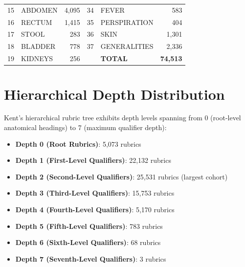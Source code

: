 \begin{sloppypar}
\begin{table}[htp]
\begin{tabular}{|c|l|r||c|l|r|}
15 & ABDOMEN            & 4,095  & 34 & FEVER              & 583    \\
16 & RECTUM             & 1,415  & 35 & PERSPIRATION       & 404    \\
17 & STOOL              & 283    & 36 & SKIN               & 1,301  \\
18 & BLADDER            & 778    & 37 & GENERALITIES       & 2,336  \\
19 & KIDNEYS            & 256    &    & \textbf{TOTAL}     & \textbf{74,513} \\
\hline
\end{tabular}
\end{table}

\section{Hierarchical Depth Distribution}
Kent's hierarchical rubric tree exhibits depth levels spanning from 0 (root-level anatomical headings) to 7 (maximum qualifier depth):
\begin{itemize}
    \item \textbf{Depth 0 (Root Rubrics)}: 5,073 rubrics
    \item \textbf{Depth 1 (First-Level Qualifiers)}: 22,132 rubrics
    \item \textbf{Depth 2 (Second-Level Qualifiers)}: 25,531 rubrics (largest cohort)
    \item \textbf{Depth 3 (Third-Level Qualifiers)}: 15,753 rubrics
    \item \textbf{Depth 4 (Fourth-Level Qualifiers)}: 5,170 rubrics
    \item \textbf{Depth 5 (Fifth-Level Qualifiers)}: 783 rubrics
    \item \textbf{Depth 6 (Sixth-Level Qualifiers)}: 68 rubrics
    \item \textbf{Depth 7 (Seventh-Level Qualifiers)}: 3 rubrics
\end{itemize}

\end{sloppypar}
